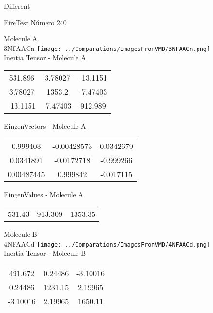 \begin{center}
\vtab
\vtab
\textcolor{NavyBlue}{\Large Different}
\end{center}

 \newpage

\vtab[-2cm]
\begin{center}
{\large FireTest \tab Número 240}
\end{center}
\begin{multicols}{2}
\begin{center}

Molecule A \\ 
3NFAACn
\texttt{[image: ../Comparations/ImagesFromVMD/3NFAACn.png]}
\\
Inertia Tensor - Molecule A \\
\vtab

\begin{tabular}{|c c c|}
531.896	 & 	3.78027	 & 	-13.1151	 \\
3.78027	 & 	1353.2	 & 	-7.47403	 \\
-13.1151	 & 	-7.47403	 & 	912.989
\end{tabular}

\vtab
 EingenVectors - Molecule A     \\
\vtab
\begin{tabular}{|c c c|}
0.999403	 & 	-0.00428573	 & 	0.0342679	 \\
0.0341891	 & 	-0.0172718	 & 	-0.999266	 \\
0.00487445	 & 	0.999842	 & 	-0.017115
\end{tabular}

\vtab
 EingenValues - Molecule A     \\
\vtab
\begin{tabular}{|c c c|}
531.43	 & 	913.309	 & 	1353.35	 \\
\end{tabular}
\columnbreak

Molecule B \\ 
4NFAACd
\texttt{[image: ../Comparations/ImagesFromVMD/4NFAACd.png]}
\\
Inertia Tensor - Molecule B \\
\vtab

\begin{tabular}{|c c c|}
491.672	 & 	0.24486	 & 	-3.10016	 \\
0.24486	 & 	1231.15	 & 	2.19965	 \\
-3.10016	 & 	2.19965	 & 	1650.11
\end{tabular}


\end{center}
\end{multicols}
